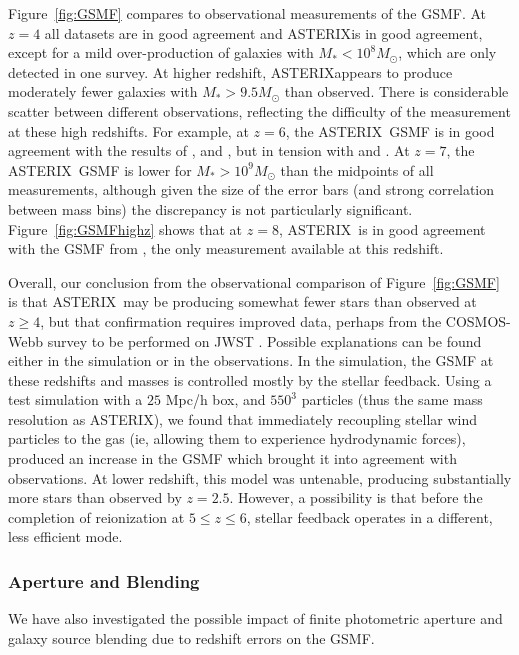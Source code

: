 \documentclass[fleqn,usenatbib]{mnras}
\newcommand{\software}[1]{{\small #1}}
\newcommand{\asterix}{\software{ASTERIX}}
\begin{document}
Figure~\ref{fig:GSMF} compares to observational measurements of the GSMF. At $z=4$ all datasets are in good agreement and \asterix is in good agreement, except for a mild over-production of galaxies with $M_* < 10^8 M_\odot$, which are only detected in one survey.
At higher redshift, \asterix appears to produce moderately fewer galaxies with $M_* > 9.5 M_\odot$ than observed. There is considerable scatter between different observations, reflecting the difficulty of the measurement at these high redshifts. For example, at $z=6$, the \asterix~GSMF is in good agreement with the results of \cite{Stefanon2017}, \cite{Gonzalez2011} and \cite{Song2016}, but in tension with \cite{Grazian2015} and \cite{Duncan2014}. At $z=7$, the \asterix~GSMF is lower for $M_* > 10^9 M_\odot$ than the midpoints of all measurements, although given the size of the error bars (and strong correlation between mass bins) the discrepancy is not particularly significant. Figure~\ref{fig:GSMFhighz} shows that at $z=8$, \asterix~is in good agreement with the GSMF from \cite{Song2016}, the only measurement available at this redshift.

Overall, our conclusion from the observational comparison of Figure~\ref{fig:GSMF} is that \asterix~may be producing somewhat fewer stars than observed at $z\geq 4$, but that confirmation requires improved data, perhaps from the COSMOS-Webb survey to be performed on JWST \cite{Cosmos-Webb}. Possible explanations can be found either in the simulation or in the observations. In the simulation, the GSMF at these redshifts and masses is controlled mostly by the stellar feedback. Using a test simulation with a $25$ Mpc/h box, and $550^3$ particles (thus the same mass resolution as \asterix), we found that immediately recoupling stellar wind particles to the gas (ie, allowing them to experience hydrodynamic forces), produced an increase in the GSMF which brought it into agreement with observations. At lower redshift, this model was untenable, producing substantially more stars than observed by $z=2.5$. However, a possibility is that before the completion of reionization at $5 \leq z \leq 6$, stellar feedback operates in a different, less efficient mode.

\subsubsection{Aperture and Blending}

We have also investigated the possible impact of finite photometric aperture and galaxy source blending due to redshift errors on the GSMF.
\end{document}
